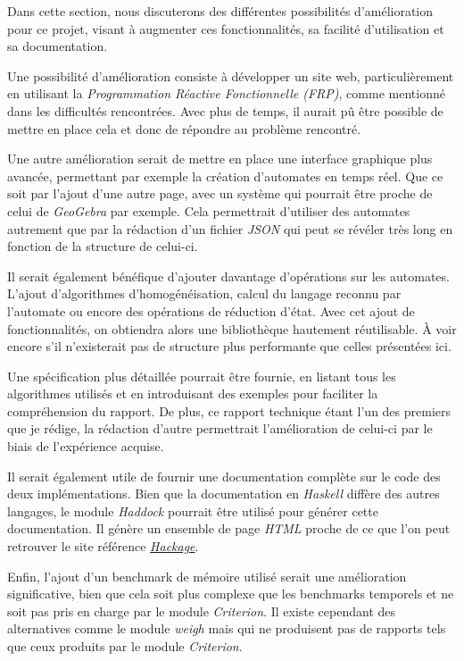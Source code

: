 Dans cette section, nous discuterons des différentes possibilités d'amélioration
pour ce projet, visant à augmenter ces fonctionnalités, sa facilité
d'utilisation et sa documentation.

Une possibilité d'amélioration consiste à développer un site web,
particulièrement en utilisant la \textit{Programmation Réactive Fonctionnelle
    (FRP)}, comme mentionné dans les difficultés rencontrées. Avec plus de temps, il
aurait pû être possible de mettre en place cela et donc de répondre au problème
rencontré.

\vphantom{}

Une autre amélioration serait de mettre en place une interface graphique plus
avancée, permettant par exemple la création d'automates en temps réel. Que ce
soit par l'ajout d'une autre page, avec un système qui pourrait être proche de
celui de \textit{GeoGebra} par exemple. Cela permettrait d'utiliser des automates
autrement que par la rédaction d'un fichier \textit{JSON} qui peut se révéler
très long en fonction de la structure de celui-ci.

\phantom{}

Il serait également bénéfique d'ajouter davantage d'opérations sur les
automates. L'ajout d'algorithmes d'homogénéisation, calcul du langage
reconnu par l'automate ou encore des opérations de réduction d'état. Avec cet
ajout de fonctionnalités, on obtiendra alors une bibliothèque hautement
réutilisable. À voir encore s'il n'existerait pas de structure plus performante
que celles présentées ici.

\vphantom{}

Une spécification plus détaillée pourrait être fournie, en listant tous les
algorithmes utilisés et en introduisant des exemples pour faciliter la
compréhension du rapport. De plus, ce rapport technique étant l'un des premiers
que je rédige, la rédaction d'autre permettrait l'amélioration de celui-ci par
le biais de l'expérience acquise.

\vphantom{}

Il serait également utile de fournir une documentation complète sur le code des
deux implémentations. Bien que la documentation en \textit{Haskell} diffère des
autres langages, le module \textit{Haddock}\cite{haddock} pourrait être utilisé pour générer
cette documentation. Il génère un ensemble de page \textit{HTML} proche de ce
que l'on peut retrouver le site référence
\href{https://hackage.haskell.org/}{\textit{Hackage}}.

\vphantom{}

Enfin, l'ajout d'un benchmark de mémoire utilisé serait une amélioration
significative, bien que cela soit plus complexe que les benchmarks temporels et
ne soit pas pris en charge par le module \textit{Criterion}. Il existe cependant
des alternatives comme le module \textit{weigh}\cite{weigh} mais qui ne produisent pas de rapports
tels que ceux produits par le module \textit{Criterion}.
